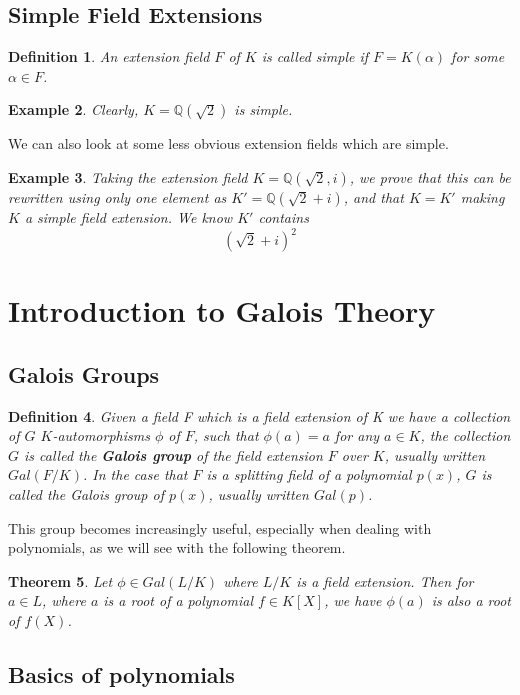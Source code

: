 \documentclass[12pt]{article}
\newtheorem{theorem}{Theorem}
\newtheorem{definition}[theorem]{Definition}
\newtheorem{example}[theorem]{Example}
\begin{document}
\subsection{Simple Field Extensions}
\begin{definition}
An extension field \(F\) of \(K\) is called simple if \(F = K(\alpha)\) for some \(\alpha \in F\).
\end{definition}
\begin{example}
Clearly, \(K = \mathbb{Q}(\sqrt{2})\) is simple.
\end{example}
We can also look at some less obvious extension fields which are simple.
\begin{example}
Taking the extension field \(K = \mathbb{Q}(\sqrt{2}, i)\), we prove that this can be rewritten using only one element as \(K' = \mathbb{Q}(\sqrt{2} + i)\), and that \(K=K'\) making \(K\) a simple field extension. We know \(K'\) contains
\[(\sqrt{2} + i)^2\]
\end{example}
\section{Introduction to Galois Theory}
\subsection{Galois Groups}
\begin{definition}
    Given a field F which is a field extension of K we have a collection of \(G\) \(K\)-automorphisms $\phi$ of $F$, such that $\phi(a) = a $ for any $ a \in K$, the collection \(G\) is called the \textbf{Galois group} of the field extension \(F\) over \(K\), usually written \(Gal(F/K)\). In the case that \(F\) is a splitting field of a polynomial \(p(x)\), \(G\) is called the Galois group of \(p(x)\), usually written \(Gal(p)\).
\end{definition}

This group becomes increasingly useful, especially when dealing with polynomials, as we will see with the following theorem.

\begin{theorem} 
Let $\phi \in Gal(L/K)$ where $L/K$ is a field extension. Then for $a \in L$, where $a$ is a root of a polynomial $f \in K[X]$, we have $\phi(a)$ is also a root of $f(X)$.
\end{theorem}

\subsection{Basics of polynomials}
\end{document}
